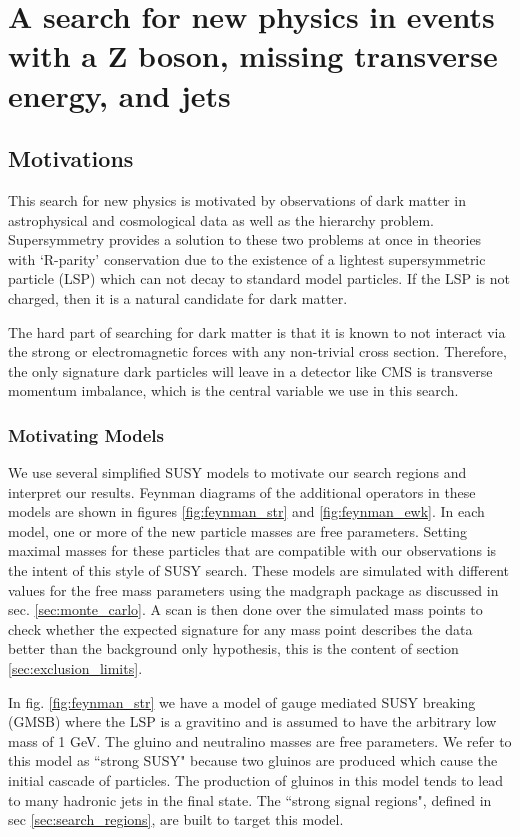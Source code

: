 \chapter{A search for new physics in events with a Z boson, missing transverse energy, and jets}

\section{Motivations}

  This search for new physics is motivated by observations of dark matter in astrophysical and cosmological data as well as the hierarchy problem. Supersymmetry provides a solution to these two problems at once in theories with `R-parity' conservation due to the existence of a lightest supersymmetric particle (LSP) which can not decay to standard model particles. If the LSP is not charged, then it is a natural candidate for dark matter. 

  The hard part of searching for dark matter is that it is known to not interact via the strong or electromagnetic forces with any non-trivial cross section. Therefore, the only signature dark particles will leave in a detector like CMS is transverse momentum imbalance, which is the central variable we use in this search.

  \subsection{Motivating Models} \label{sec:susy_models}

  We use several simplified SUSY models to motivate our search regions and interpret our results. Feynman diagrams of the additional operators in these models are shown in figures \ref{fig:feynman_str} and \ref{fig:feynman_ewk}. In each model, one or more of the new particle masses are free parameters. Setting maximal masses for these particles that are compatible with our observations is the intent of this style of SUSY search. These models are simulated with different values for the free mass parameters using the madgraph package as discussed in sec. \ref{sec:monte_carlo}. A scan is then done over the simulated mass points to check whether the expected signature for any mass point describes the data better than the background only hypothesis, this is the content of section \ref{sec:exclusion_limits}.

  In fig. \ref{fig:feynman_str} we have a model of gauge mediated SUSY breaking (GMSB) where the LSP is a gravitino and is assumed to have the arbitrary low mass of 1 GeV. The gluino and neutralino masses are free parameters. We refer to this model as ``strong SUSY" because two gluinos are produced which cause the initial cascade of particles. The production of gluinos in this model tends to lead to many hadronic jets in the final state. The ``strong signal regions", defined in sec \ref{sec:search_regions}, are built to target this model.

